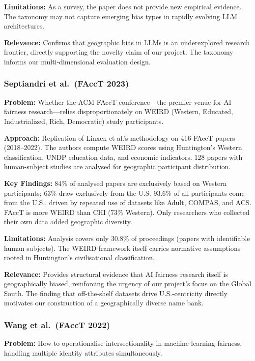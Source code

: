 \documentclass[12pt,a4paper]{article}
\begin{document}
\textbf{Limitations:} As a survey, the paper does not provide new empirical evidence. The taxonomy may not capture emerging bias types in rapidly evolving LLM architectures.

\textbf{Relevance:} Confirms that geographic bias in LLMs is an underexplored research frontier, directly supporting the novelty claim of our project. The taxonomy informs our multi-dimensional evaluation design.

\subsubsection{Septiandri et al.\ (FAccT 2023)~\cite{septiandri2023}}
\textbf{Problem:} Whether the ACM FAccT conference---the premier venue for AI fairness research---relies disproportionately on WEIRD (Western, Educated, Industrialized, Rich, Democratic) study participants.

\textbf{Approach:} Replication of Linxen et al.'s methodology on 416 FAccT papers (2018--2022). The authors compute WEIRD scores using Huntington's Western classification, UNDP education data, and economic indicators. 128 papers with human-subject studies are analysed for geographic participant distribution.

\textbf{Key Findings:} 84\% of analysed papers are exclusively based on Western participants; 63\% draw exclusively from the U.S. 93.6\% of all participants come from the U.S., driven by repeated use of datasets like Adult, COMPAS, and ACS. FAccT is more WEIRD than CHI (73\% Western). Only researchers who collected their own data added geographic diversity.

\textbf{Limitations:} Analysis covers only 30.8\% of proceedings (papers with identifiable human subjects). The WEIRD framework itself carries normative assumptions rooted in Huntington's civilisational classification.

\textbf{Relevance:} Provides structural evidence that AI fairness research itself is geographically biased, reinforcing the urgency of our project's focus on the Global South. The finding that off-the-shelf datasets drive U.S.-centricity directly motivates our construction of a geographically diverse name bank.

\subsubsection{Wang et al.\ (FAccT 2022)~\cite{wang2022}}
\textbf{Problem:} How to operationalise intersectionality in machine learning fairness, handling multiple identity attributes simultaneously.
\end{document}
